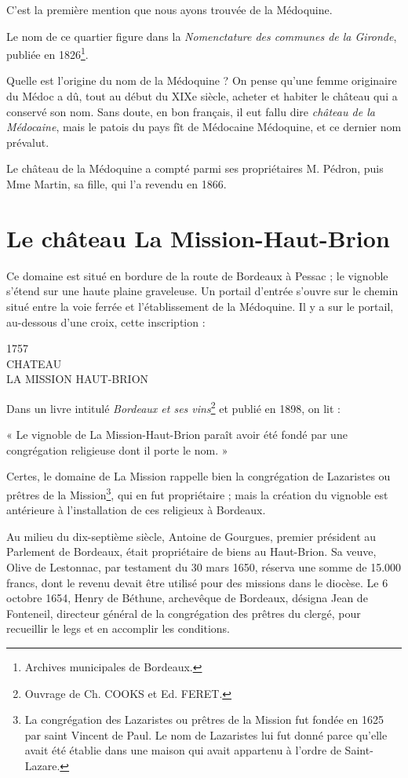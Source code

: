 C'est la première mention que nous ayons trouvée de la Médoquine.

Le nom de ce quartier figure dans la \textit{Nomenctature des communes de la Gironde}, publiée en 1826\footnote{Archives municipales de Bordeaux.}.

Quelle est l'origine du nom de la Médoquine ? On pense qu'une femme originaire du Médoc a dû, tout au début du XIXe siècle, acheter et habiter le château qui a conservé son nom. Sans doute, en bon français, il eut fallu dire \textit{château de la Médocaine}, mais le patois du pays fît de Médocaine Médoquine, et ce dernier nom prévalut.

Le château de la Médoquine a compté parmi ses propriétaires M. Pédron, puis Mme Martin, sa fille, qui l'a revendu en 1866.

\section{Le château La Mission-Haut-Brion}

Ce domaine est situé en bordure de la route de Bordeaux à Pessac ; le vignoble s'étend sur une haute plaine graveleuse. Un portail d'entrée s'ouvre sur le chemin situé entre la voie ferrée et l'établissement de la Médoquine. Il y a sur le portail, au-dessous d'une croix, cette inscription :

\begin{center}
1757\\
CHATEAU\\
LA MISSION HAUT-BRION
\end{center}

Dans un livre intitulé \textit{Bordeaux et ses vins}\footnote{Ouvrage de Ch. COOKS et Ed. FERET.} et publié en 1898, on lit :

« Le vignoble de La Mission-Haut-Brion paraît avoir été fondé par une congrégation religieuse dont il porte le nom. »

Certes, le domaine de La Mission rappelle bien la congrégation de Lazaristes ou prêtres de la Mission\footnote{La congrégation des Lazaristes ou prêtres de la Mission fut fondée en 1625 par saint Vincent de Paul. Le nom de Lazaristes lui fut donné parce qu'elle avait été établie dans une maison qui avait appartenu à l'ordre de Saint-Lazare. }, qui en fut propriétaire ; mais la création du vignoble est antérieure à l'installation de ces religieux à Bordeaux.

Au milieu du dix-septième siècle, Antoine de Gourgues, premier président au Parlement de Bordeaux, était propriétaire de biens au Haut-Brion. Sa veuve, Olive de Lestonnac, par testament du 30 mars 1650, réserva une somme de 15.000 francs, dont le revenu devait être utilisé pour des missions dans le diocèse. Le 6 octobre 1654, Henry de Béthune, archevêque de Bordeaux, désigna Jean de Fonteneil, directeur général de la congrégation des prêtres du clergé, pour recueillir le legs et en accomplir les conditions.

